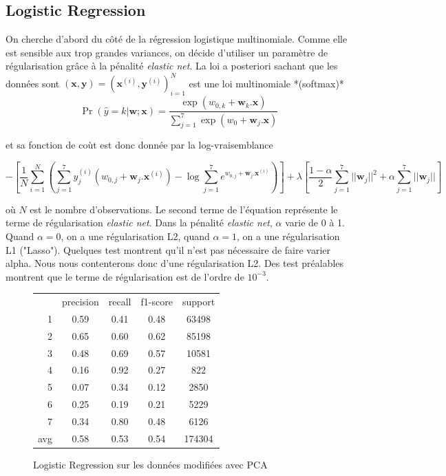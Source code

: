\documentclass[12pt,a4paper]{article}
\numberwithin{equation}{section}
\begin{document}
	\subsection{Logistic Regression}
	
	On cherche d'abord du côté de la régression logistique multinomiale. Comme elle est sensible aux trop grandes variances, on décide d'utiliser un paramètre de régularisation grâce à la pénalité \textit{elastic net}. La loi a posteriori sachant que les données sont $(\textbf{x},\textbf{y}) = (\textbf{x}^{(i)},\textbf{y}^{(i)})_{i=1}^N$ est une loi multinomiale *(softmax)* 
	$$\Pr (\widehat{y}=k \vert \textbf{w};\textbf{x}) = \frac{\exp(w_{0,k} + \textbf{w}_k .\textbf{x})}{\sum_{j=1}^7 \exp(w_0 + \textbf{w}_j . \textbf{x})} $$ 
	
	et sa fonction de coùt est donc donnée par la log-vraisemblance 
	
	$$- \left[\frac{1}{N} \sum_{i=1}^{N} \left( \sum_{j=1}^7 y^{(i)}_j (w_{0,j} + \textbf{w}_j.\textbf{x}^{(i)}) - \log \sum_{j=1}^7 e^{w_{0,j} + \textbf{w}_j . \textbf{x}^{(i)}} \right) \right] + \lambda \left[ \frac{1 - \alpha}{2} \sum_{j=1}^7 \vert \vert \textbf{w}_j \vert \vert^2 + \alpha \sum_{j=1}^7 \vert \vert \textbf{w}_j \vert \vert \right]$$
	
	où $N$ est le nombre d'observations. Le second terme de l'équation représente le terme de régularisation \textit{elastic net}. Dans la pénalité \textit{elastic net}, $\alpha$ varie de 0 à 1. Quand $\alpha=0$, on a une régularisation L2, quand $\alpha=1$, on a une régularisation L1 ("Lasso"). Quelques test montrent qu'il n'est pas nécessaire de faire varier alpha. Nous nous contenterons donc d'une régularisation L2. Des test préalables montrent que le terme de régularisation est de l'ordre de $10^{-3}$.\\
	
	\begin{figure}
		\centering
		\begin{tabular}{r cccc}
			& precision & recall &f1-score &  support  \\
			1    &   0.59   &    0.41  &    0.48  &   63498 \\
			2    &   0.65   &   0.60    &  0.62   &  85198 \\
			3    &   0.48   &   0.69   &   0.57  &    10581 \\
			4    &   0.16   &   0.92   &   0.27   &   822 \\
			5    &   0.07   &   0.34    &  0.12     &  2850\\
			6    &   0.25   &   0.19  &    0.21 &     5229\\
			7    &   0.34   & 0.80     & 0.48     & 6126\\
			avg    &    0.58   &   0.53  &    0.54  &  174304	\\
		\end{tabular}
		\caption{Logistic Regression sur les données modifiées avec PCA}
		\label{log pca}
	\end{figure}
	
\end{document}
